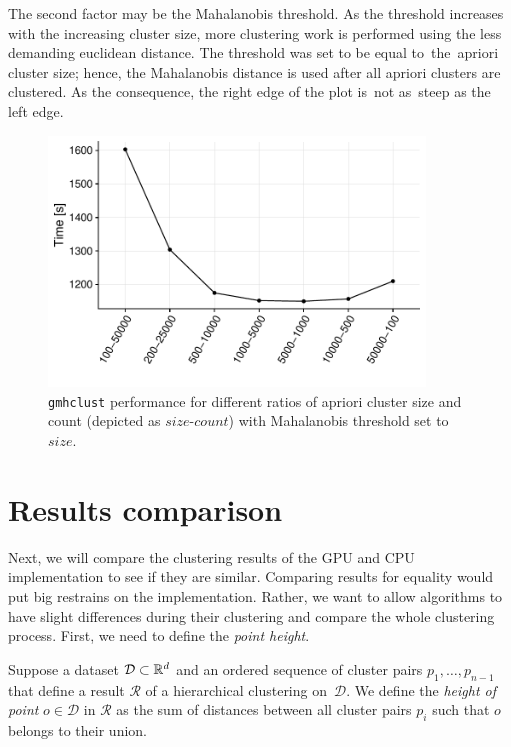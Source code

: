 The second factor may be the Mahalanobis threshold. As the threshold increases with the increasing cluster size, more clustering work is performed using the less demanding euclidean distance. The threshold was set to be equal to~the~apriori cluster size; hence, the Mahalanobis distance is used after all apriori clusters are clustered. As the consequence, the right edge of the plot is~not as~steep as the left edge.

\begin{figure}\centering
	\includegraphics[width=10cm]{img/5M-compare}
	\caption{\texttt{gmhclust} performance for different ratios of apriori cluster size and count (depicted as $size$-$count$) with Mahalanobis threshold set to $size$.}
	\label{fig04:apr_ratio}
\end{figure}

\section{Results comparison}

Next, we will compare the clustering results of the GPU and CPU implementation to see if they are similar. Comparing results for equality would put big restrains on the implementation. Rather, we want to allow algorithms to have slight differences during their clustering and compare the whole clustering process. First, we need to define the \emph{point height}.

\begin{defn}
	Suppose a dataset $\mathcal{D} \subset \mathbb{R}^d$  and an ordered sequence of cluster pairs $p_1,\dots,p_{n-1}$ that define a result $\mathcal{R}$ of a hierarchical clustering on~$\mathcal{D}$. We define the \emph{height of point} $o \in \mathcal{D}$ in $\mathcal{R}$ as the sum of distances between all cluster pairs $p_i$ such that $o$ belongs to  their union.
\end{defn}

